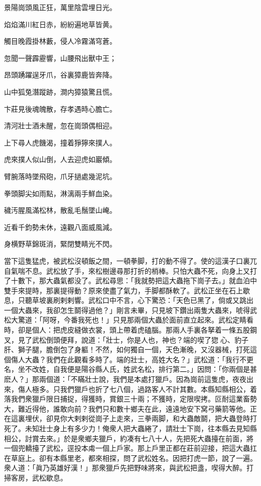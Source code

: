 \begin{myquote}
景陽崗頭風正狂，萬里陰雲埋日光。

焰焰滿川紅日赤，紛紛遍地草皆黄。

觸目晚霞掛林藪，侵人冷霧滿穹蒼。

忽聞一聲霹靂響，山腰飛出獸中王；

昂頭踴躍逞牙爪，谷裏獐鹿皆奔降。

山中狐兔潛蹤跡，澗内獐猿驚且慌。

卞莊見後魂魄散，存孝遇時心膽亡。

清河壯士酒未醒，忽在崗頭偶相迎。

上下尋人虎饑渴，撞着猙獰來撲人。

虎來撲人似山倒，人去迎虎如巖傾。

臂腕落時墜飛砲，爪牙撾處幾泥坑。

拳頭脚尖如雨點，淋漓兩手鮮血染。

穢汚腥風滿松林，散亂毛鬚墜山崦。

近看千鈞勢未休，遠觀八面威風減。

身横野草錦斑消，緊閉雙睛光不閃。
\end{myquote}
	
當下這隻猛虎，被武松沒頓飯之間，一頓拳脚，打的動不得了。使的這漢子口裏兀自氣喘不息。武松放了手，來松樹邊尋那打折的梢棒。只怕大蟲不死，向身上又打了十數下，那大蟲氣都没了。武松尋思：「我就勢把這大蟲拖下崗子去。」就血泊中雙手來提時，那裏提得動？原來使盡了氣力，手脚都酥軟了。武松正坐在石上歇息，只聽草坡裏刷剌剌響。武松口中不言，心下驚恐：「天色已黑了，倘或又跳出一個大蟲來，我卻怎生鬬得過他？」剛言未畢，只見坡下鑽出兩隻大蟲來，唬得武松大驚道：「阿呀，今番我死也！」只見那兩個大蟲於面前直立起來。武松定睛看時，卻是個人：把虎皮縫做衣裳，頭上帶着虎磕腦。那兩人手裏各拏着一條五股鋼叉，見了武松倒頭便拜，說道：「壯士，你是人也，神也？端的喫了㺀𤝽心、豹子肝、獅子腿，膽倒包了身軀！不然，如何獨自一個，天色漸晚，又沒器械，打死這個傷人大蟲？我們在此觀看多時了。端的壯士，高姓大名？」武松道：「我行不更名，坐不改姓，自我便是陽谷縣人氏，姓武名松，排行第二。」因問：「你兩個是甚麽人？」那兩個道：「不瞞壯士說，我們是本處打獵戶。因為崗前這隻虎，夜夜出來，傷人極多。只我們獵戶也折了七八個，過路客人不計其數。本縣知縣相公，着落我們衆獵戶限日捕捉，得獲時，賞銀三十兩；不獲時，定限喫拷。叵耐這業畜勢大，難近得他，誰敢向前？我們只和數十鄉夫在此，遠遠地安下窝弓藥箭等他。正在這裏埋伏，卻見你大剌剌從崗子上走來，三拳兩脚，和大蟲敵鬬，把大蟲登時打死了。未知壯士身上有多少力！俺衆人把大蟲綣了，請壯士下崗，往本縣去見知縣相公，討賞去來。」於是衆鄉夫獵戶，約凑有七八十人，先把死大蟲擡在前面，將一個兜轎擡了武松，逕投本䖏一個上戶家。那上戶里正都在莊前迎接，把這大蟲扛在草庭上。卻有本縣里老，都來相探，問了武松姓名。因把打虎一節，說了一遍。衆人道：「眞乃英雄好漢！」那衆獵戶先把野味將來，與武松把盞，喫得大醉。打掃客房，武松歇息。

